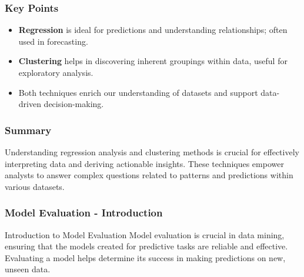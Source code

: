 \documentclass[aspectratio=169]{beamer}
\begin{document}
\begin{frame}[fragile]
    \frametitle{Key Points}
    \begin{itemize}
        \item \textbf{Regression} is ideal for predictions and understanding relationships; often used in forecasting.
        \item \textbf{Clustering} helps in discovering inherent groupings within data, useful for exploratory analysis.
        \item Both techniques enrich our understanding of datasets and support data-driven decision-making.
    \end{itemize}
\end{frame}

\begin{frame}[fragile]
    \frametitle{Summary}
    Understanding regression analysis and clustering methods is crucial for effectively interpreting data and deriving actionable insights. These techniques empower analysts to answer complex questions related to patterns and predictions within various datasets.
\end{frame}

\begin{frame}[fragile]
    \frametitle{Model Evaluation - Introduction}
    \begin{block}{Introduction to Model Evaluation}
        Model evaluation is crucial in data mining, ensuring that the models created for predictive tasks are reliable and effective.
        Evaluating a model helps determine its success in making predictions on new, unseen data.
    \end{block}
\end{frame}
\end{document}
